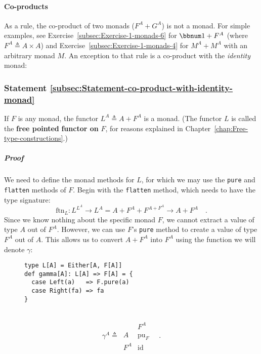 \paragraph{Co-products}

As a rule, the co-product of two monads ($F^{A}+G^{A}$) is not a
monad. For simple examples, see Exercise~\ref{subsec:Exercise-1-monads-6}
for $\bbnum 1+F^{A}$ (where $F^{A}\triangleq A\times A$) and Exercise~\ref{subsec:Exercise-1-monads-4}
for $M^{A}+M^{A}$ with an arbitrary monad $M$. An exception to that
rule is a co-product with the \emph{identity} monad:

\subsubsection{Statement \label{subsec:Statement-co-product-with-identity-monad}\ref{subsec:Statement-co-product-with-identity-monad}}

If $F$ is any monad, the functor $L^{A}\triangleq A+F^{A}$ is a
monad. (The functor $L$ is called the \textbf{free pointed}
\textbf{functor on} $F$, for reasons explained in Chapter~\ref{chap:Free-type-constructions}.)

\subparagraph{Proof}

We need to define the monad methods for $L$, for which we may use
the \lstinline!pure! and \lstinline!flatten! methods of $F$. Begin
with the \lstinline!flatten! method, which needs to have the type
signature:
\[
\text{ftn}_{L}:L^{L^{A}}\rightarrow L^{A}=A+F^{A}+F^{A+F^{A}}\rightarrow A+F^{A}\quad.
\]
Since we know nothing about the specific monad $F$, we cannot extract
a value of type $A$ out of $F^{A}$. However, we can use $F$\textsf{'}s \lstinline!pure!
method to create a value of type $F^{A}$ out of $A$. This allows
us to convert $A+F^{A}$ into $F^{A}$ using the function we will
denote $\gamma$:

\begin{wrapfigure}{l}{0.55\columnwidth}%
\vspace{-0.8\baselineskip}
\begin{lstlisting}
type L[A] = Either[A, F[A]]
def gamma[A]: L[A] => F[A] = {
  case Left(a)   => F.pure(a)
  case Right(fa) => fa
}
\end{lstlisting}

\vspace{-2\baselineskip}
\end{wrapfigure}%

~\vspace{-0.2\baselineskip}
\[
\gamma^{A}\triangleq\,\begin{array}{|c||c|}
 & F^{A}\\
\hline A & \text{pu}_{F}\\
F^{A} & \text{id}
\end{array}\quad.
\]

